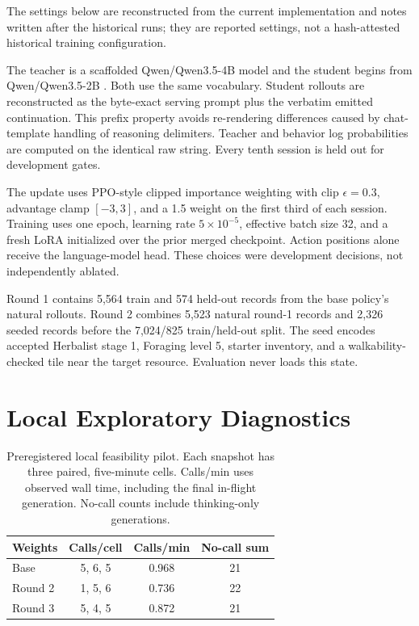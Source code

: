 \documentclass[11pt,a4paper]{article}
\begin{document}
The settings below are reconstructed from the current implementation and notes
written after the historical runs; they are reported settings, not a
hash-attested historical training configuration.

The teacher is a scaffolded Qwen/Qwen3.5-4B model and the student begins from
Qwen/Qwen3.5-2B \citep{qwen35modelcards2026}. Both use the same vocabulary.
Student rollouts are reconstructed
as the byte-exact serving prompt plus the verbatim emitted continuation. This
prefix property avoids re-rendering differences caused by chat-template handling
of reasoning delimiters. Teacher and behavior log probabilities are computed on
the identical raw string. Every tenth session is held out for development gates.

The update uses PPO-style clipped importance weighting
\citep{schulman2017ppo} with clip $\epsilon=0.3$,
advantage clamp $[-3,3]$, and a 1.5 weight on the first third of each session.
Training uses one epoch, learning rate $5\times10^{-5}$, effective batch size 32,
and a fresh LoRA initialized over the prior merged checkpoint. Action positions
alone receive the language-model head. These choices were development decisions,
not independently ablated.

Round 1 contains 5,564 train and 574 held-out records from the base policy's
natural rollouts. Round 2 combines 5,523 natural round-1 records and 2,326 seeded
records before the 7,024/825 train/held-out split. The seed encodes accepted
Herbalist stage 1, Foraging level 5, starter inventory, and a walkability-checked tile near
the target resource. Evaluation never loads this state.

\section{Local Exploratory Diagnostics}
\label{app:localpilot}

\begin{table}[h]
\caption{Preregistered local feasibility pilot. Each snapshot has three paired,
five-minute cells. Calls/min uses observed wall time, including the final
in-flight generation. No-call counts include thinking-only generations.}
\label{tab:localpilot}
\centering
\small
\begin{tabular}{lccc}
\toprule
Weights & Calls/cell & Calls/min & No-call sum \\
\midrule
Base & 5, 6, 5 & 0.968 & 21 \\
Round 2 & 1, 5, 6 & 0.736 & 22 \\
Round 3 & 5, 4, 5 & 0.872 & 21 \\
\bottomrule
\end{tabular}
\end{table}
\end{document}
